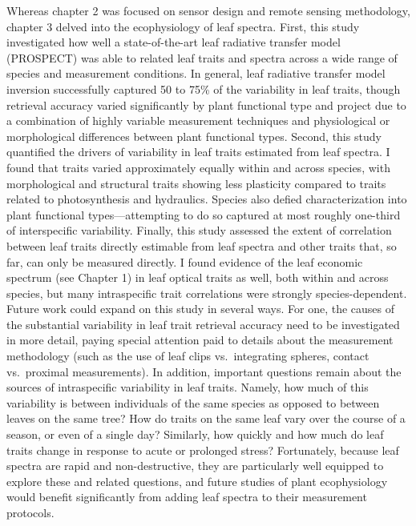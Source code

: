 Whereas chapter 2 was focused on sensor design and remote sensing methodology, chapter 3 delved into the ecophysiology of leaf spectra.
First, this study investigated how well a state-of-the-art leaf radiative transfer model (PROSPECT) was able to related leaf traits and spectra across a wide range of species and measurement conditions.
In general, leaf radiative transfer model inversion successfully captured 50 to 75\% of the variability in leaf traits, though retrieval accuracy varied significantly by plant functional type and project due to a combination of highly variable measurement techniques and physiological or morphological differences between plant functional types.
Second, this study quantified the drivers of variability in leaf traits estimated from leaf spectra.
I found that traits varied approximately equally within and across species, with morphological and structural traits showing less plasticity compared to traits related to photosynthesis and hydraulics.
Species also defied characterization into plant functional types---attempting to do so captured at most roughly one-third of interspecific variability.
Finally, this study assessed the extent of correlation between leaf traits directly estimable from leaf spectra and other traits that, so far, can only be measured directly.
I found evidence of the leaf economic spectrum (see Chapter 1) in leaf optical traits as well, both within and across species, but many intraspecific trait correlations were strongly species-dependent.
Future work could expand on this study in several ways.
For one, the causes of the substantial variability in leaf trait retrieval accuracy need to be investigated in more detail, paying special attention paid to details about the measurement methodology (such as the use of leaf clips vs.\ integrating spheres, contact vs.\ proximal measurements).
In addition, important questions remain about the sources of intraspecific variability in leaf traits.
Namely, how much of this variability is between individuals of the same species as opposed to between leaves on the same tree?
How do traits on the same leaf vary over the course of a season, or even of a single day?
Similarly, how quickly and how much do leaf traits change in response to acute or prolonged stress?
Fortunately, because leaf spectra are rapid and non-destructive, they are particularly well equipped to explore these and related questions, and future studies of plant ecophysiology would benefit significantly from adding leaf spectra to their measurement protocols.

